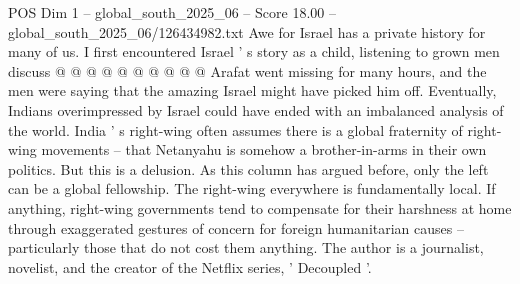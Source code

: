 \begin{textsample}{POS Dim 1 – global\_south\_2025\_06 – Score 18.00 – global\_south\_2025\_06/126434982.txt}
Awe for Israel has a private history for many of us.
I first encountered Israel ' s story as a child, listening to grown men discuss @ @ @ @ @ @ @ @ @ @ Arafat went missing for many hours, and the men were saying that the amazing Israel might have picked him off.
Eventually, Indians overimpressed by Israel could have ended with an imbalanced analysis of the world.
India ' s right-wing often assumes there is a global fraternity of right-wing movements -- that Netanyahu is somehow a brother-in-arms in their own politics.
But this is a delusion.
As this column has argued before, only the left can be a global fellowship.
The right-wing everywhere is fundamentally local.
If anything, right-wing governments tend to compensate for their harshness at home through exaggerated gestures of concern for foreign humanitarian causes -- particularly those that do not cost them anything.
The author is a journalist, novelist, and the creator of the Netflix series, ' Decoupled '.

\end{textsample}
